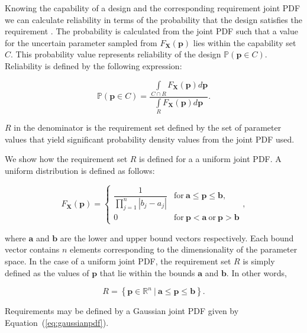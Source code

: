 Knowing the capability of a design and the corresponding requirement joint \ac{PDF} we can calculate reliability in terms of the probability that the design satisfies the requirement \cite{ForouzandehShahraki2014,Bucher2009}. The probability is calculated from the joint \ac{PDF} such that a value for the uncertain parameter sampled from $F_{\mathbf{X}}\left(\mathbf{p}\right)$ lies within the capability set $C$. This probability value represents reliability of the design $\mathbb{P}(\mathbf{p} \in C)$. Reliability is defined by the following expression:

\begin{equation} \label{eq:reliability}
	\mathbb{P}(\mathbf{p} \in C) = \dfrac{\int\limits_{C\cap R} F_{\mathbf{X}}(\mathbf{p}) d\mathbf{p}}{\int\limits_{R} F_{\mathbf{X}}(\mathbf{p}) d\mathbf{p}}.
\end{equation}

$R$ in the denominator is the requirement set defined by the set of parameter values that yield significant probability density values from the joint \ac{PDF} used. 

We show how the requirement set $R$ is defined for a a uniform joint \ac{PDF}. A uniform distribution is defined as follows:

\begin{equation} \label{eq:uniformpdf}
	F_\mathbf{X}(\mathbf{p})={\begin{cases}{\dfrac {1}{\prod\limits_{j=1}^{n} \left|b_j - a_j\right|}}&\mathrm {for} \ \mathbf{a}\leq \mathbf{p}\leq \mathbf{b},\\[8pt]0&\mathrm {for} \ \mathbf{p}<\mathbf{a}\ \mathrm {or} \ \mathbf{p}>\mathbf{b}\end{cases}},
\end{equation}

where $\mathbf{a}$ and $\mathbf{b}$ are the lower and upper bound vectors respectively. Each bound vector contains $n$ elements corresponding to the dimensionality of the parameter space. In the case of a uniform joint \ac{PDF}, the requirement set $R$ is simply defined as the values of $\mathbf{p}$ that lie within the bounds $\mathbf{a}$ and $\mathbf{b}$. In other words,

\begin{equation} \label{eq:requirementsetuniform}
	\textit{R} = \left\{\mathbf{p} \in \mathbb{R}^n~|~\mathbf{a}\leq \mathbf{p}\leq \mathbf{b}\right\}.
\end{equation}

Requirements may be defined by a Gaussian joint \ac{PDF} given by Equation~(\ref{eq:gaussianpdf}).

